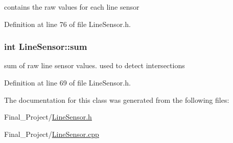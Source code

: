 contains the raw values for each line sensor 



Definition at line 76 of file Line\-Sensor.\-h.

\hypertarget{classLineSensor_af574319adc88f5949f03239b2bcbc222}{
\subsubsection[{sum}]{\setlength{\rightskip}{0pt plus 5cm}int Line\-Sensor\-::sum\hspace{0.3cm}{\ttfamily [private]}}}\label{classLineSensor_af574319adc88f5949f03239b2bcbc222}


sum of raw line sensor values. used to detect intersections 



Definition at line 69 of file Line\-Sensor.\-h.



The documentation for this class was generated from the following files\-:\begin{DoxyCompactItemize}
\item 
Final\-\_\-\-Project/\hyperlink{LineSensor_8h}{Line\-Sensor.\-h}\item 
Final\-\_\-\-Project/\hyperlink{LineSensor_8cpp}{Line\-Sensor.\-cpp}\end{DoxyCompactItemize}
